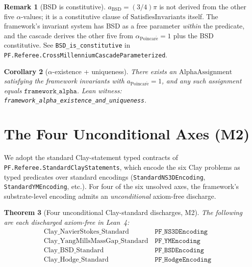 \documentclass[11pt,a4paper]{article}
\theoremstyle{plain}
\newtheorem{theorem}{Theorem}[section]
\newtheorem{corollary}[theorem]{Corollary}
\theoremstyle{definition}
\newtheorem{remark}[theorem]{Remark}
\begin{document}
\begin{remark}[BSD is constitutive]
$a_{\mathrm{BSD}} = (3/4)\pi$ is not derived from the other five
$\alpha$-values; it is a constitutive clause of
$\mathrm{SatisfiesInvariants}$ itself. The framework's invariant
system has BSD as a free parameter \emph{within} the predicate, and
the cascade derives the other five from $\alpha_{\mathrm{Poincar\acute e}} = 1$
plus the BSD constitutive. See
\texttt{BSD\_is\_constitutive} in
\texttt{PF.Referee.CrossMillenniumCascadeParameterized}.
\end{remark}

\begin{corollary}[$\alpha$-existence + uniqueness]
There exists an $\mathrm{AlphaAssignment}$ satisfying the framework
invariants with $a_{\mathrm{Poincar\acute e}} = 1$, and any such
assignment equals $\mathtt{framework\_alpha}$. Lean witness:
\texttt{framework\_alpha\_existence\_and\_uniqueness}.
\end{corollary}

\section{The Four Unconditional Axes (M2)}
\label{sec:four_unconditional}

We adopt the standard Clay-statement typed contracts of
\texttt{PF.Referee.StandardClayStatements}, which encode the six Clay
problems as typed predicates over standard encodings
(\texttt{StandardNS3DEncoding},
\texttt{StandardYMEncoding}, etc.). For four of the six unsolved
axes, the framework's substrate-level encoding admits an
\emph{unconditional} axiom-free discharge.

\begin{theorem}[Four unconditional Clay-standard discharges, M2]
\label{thm:four_unconditional}
The following are each discharged axiom-free in Lean~4:
\begin{align*}
\mathrm{Clay\_NavierStokes\_Standard}\,&\mathtt{PF\_NS3DEncoding} \\
\mathrm{Clay\_YangMillsMassGap\_Standard}\,&\mathtt{PF\_YMEncoding} \\
\mathrm{Clay\_BSD\_Standard}\,&\mathtt{PF\_BSDEncoding} \\
\mathrm{Clay\_Hodge\_Standard}\,&\mathtt{PF\_HodgeEncoding}
\end{align*}
\end{theorem}
\end{document}
